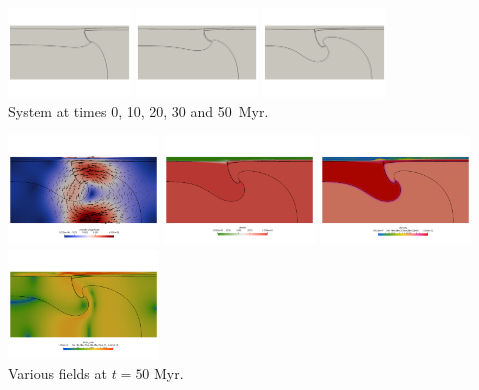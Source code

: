 \begin{center}
\includegraphics[width=3.25cm]{python_codes/fieldstone_118/results/case1/c}
\includegraphics[width=3.25cm]{python_codes/fieldstone_118/results/case1/d}
\includegraphics[width=3.25cm]{python_codes/fieldstone_118/results/case1/e}\\
{\captionfont System at times 0, 10, 20, 30 and 50~Myr.}
\end{center}


\begin{center}
\includegraphics[width=4cm]{python_codes/fieldstone_118/results/case1/vel}
\includegraphics[width=4cm]{python_codes/fieldstone_118/results/case1/rho}
\includegraphics[width=4cm]{python_codes/fieldstone_118/results/case1/eta}
\includegraphics[width=4cm]{python_codes/fieldstone_118/results/case1/sr}\\
{\captionfont Various fields at $t=50$ Myr.}
\end{center}

